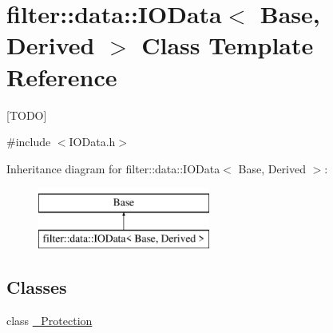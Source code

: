 \hypertarget{classfilter_1_1data_1_1_i_o_data}{}\section{filter\+:\+:data\+:\+:I\+O\+Data$<$ Base, Derived $>$ Class Template Reference}
\label{classfilter_1_1data_1_1_i_o_data}


\mbox{[}T\+O\+DO\mbox{]}  




{\ttfamily \#include $<$I\+O\+Data.\+h$>$}

Inheritance diagram for filter\+:\+:data\+:\+:I\+O\+Data$<$ Base, Derived $>$\+:\begin{figure}[H]
\begin{center}
\leavevmode
\includegraphics[height=2.000000cm]{d0/d51/classfilter_1_1data_1_1_i_o_data}
\end{center}
\end{figure}
\subsection*{Classes}
\begin{DoxyCompactItemize}
\item 
class \hyperlink{classfilter_1_1data_1_1_i_o_data_1_1___protection}{\+\_\+\+Protection}
\end{DoxyCompactItemize}
